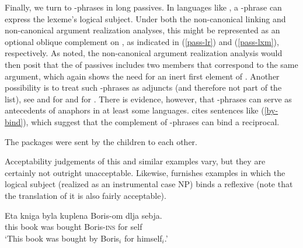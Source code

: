 \documentclass[output=paper
 	        ,biblatex
                ,babelshorthands
                ,newtxmath
                ,draftmode
                ,colorlinks, citecolor=brown
]{langscibook}
\begin{document}


Finally, we turn to -phrases in long passives.
In languages like , a -phrase can express the lexeme's logical subject.
Under both the non-canonical linking and non-canonical argument realization analyses, this might be represented as an optional oblique complement on \argst, as indicated in (\ref{pass-lr}) and (\ref{pass-lxm}), respectively.
As noted, the non-canonical argument realization analysis would then posit that the \argst of passives includes two members that correspond to the same argument, which again shows the need for an inert first element of \argst.
Another possibility is to treat such -phrases as adjuncts (and therefore not part of the \argst list), see \citet[Chapter 7]{Hoehle78a} and \citet[292--294]{Mueller2003e} for  and \citet[180]{Jackendoff1990} for . 
There is evidence, however, that -phrases can serve as antecedents of anaphors in at least some languages.
\citet[111]{Collins2005} cites sentences like (\ref{by-bind}), which suggest that the complement of -phrases can bind a reciprocal.

\begin{exe}
\ex\label{by-bind}The packages were sent by the children to each other.
\end{exe} 

\noindent
Acceptability judgements of this and similar examples vary, but they are certainly not outright unacceptable.  Likewise, \citet[10]{Perlmutter1984} furnishes  examples in which the logical subject (realized as an instrumental case NP) binds a reflexive (note that the  translation of it is also fairly acceptable).

\begin{exe}
\ex     \label{arg-st:russian-pass}
\gll Eta kniga byla kuplena Boris-om dlja sebja.  \\
     this book was bought Boris-\textsc{ins} for self  \\
\glt `This book was bought by Boris$_{i}$ for himself$_{i}$.'
\end{exe}
\end{document}
